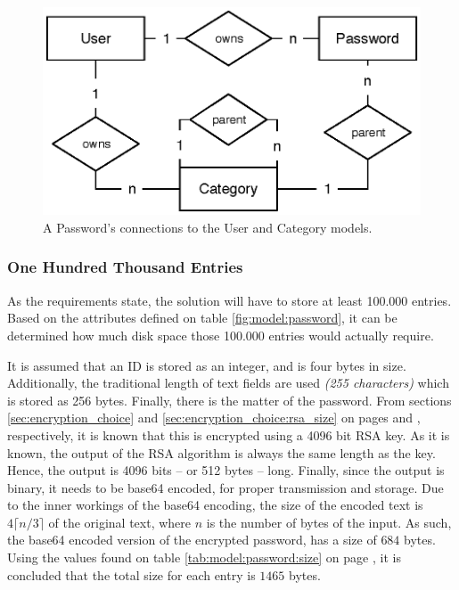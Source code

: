 			\begin{figure}[p]
				\centering
				\includegraphics[scale=0.75]{figures/design/uml/erd/user-password-category.eps}
				\caption{A Password's connections to the User and Category models.}
				\label{fig:relationship:password}
			\end{figure}

			\subsubsection{One Hundred Thousand Entries}
				\label{sec:model:password:size}
				As the requirements state, the solution will have to store at least 100.000 entries. Based on the attributes defined on table \ref{fig:model:password}, it can be determined how much disk space those 100.000 entries would actually require.

				It is assumed that an ID is stored as an integer, and is four bytes in size. Additionally, the traditional length of text fields are used \emph{(255 characters)} which is stored as 256 bytes. Finally, there is the matter of the password. From sections \ref{sec:encryption_choice} and \ref{sec:encryption_choice:rsa_size} on pages \pageref{sec:encryption_choice} and \pageref{sec:encryption_choice:rsa_size}, respectively, it is known that this is encrypted using a 4096 bit RSA key. As it is known, the output of the RSA algorithm is always the same length as the key. Hence, the output is 4096 bits -- or 512 bytes -- long. Finally, since the output is binary, it needs to be base64 encoded, for proper transmission and storage. Due to the inner workings of the base64 encoding, the size of the encoded text is $4\lceil{n/3}\rceil$ of the original text, where $n$ is the number of bytes of the input. As such, the base64 encoded version of the encrypted password, has a size of $684$ bytes. Using the values found on table \ref{tab:model:password:size} on page \pageref{tab:model:password:size}, it is concluded that the total size for each entry is $1465$ bytes.

